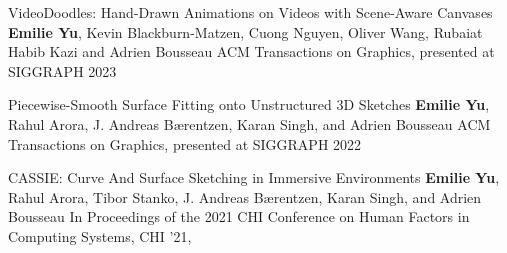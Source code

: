 

\begin{cvpubs}
  \cvpub
    {VideoDoodles: Hand-Drawn Animations on Videos with Scene-Aware Canvases} %
    {\textbf{Emilie Yu}, Kevin Blackburn-Matzen, Cuong Nguyen, Oliver Wang, Rubaiat Habib Kazi and Adrien Bousseau} %
    {ACM Transactions on Graphics, presented at SIGGRAPH 2023} %

  \cvpub
    {Piecewise-Smooth Surface Fitting onto Unstructured 3D Sketches} %
    {\textbf{Emilie Yu}, Rahul Arora, J. Andreas Bærentzen, Karan Singh, and Adrien
    Bousseau} %
    {ACM Transactions on Graphics, presented at SIGGRAPH 2022} %

  \cvpub
    {CASSIE: Curve And Surface Sketching in Immersive Environments} %
    {\textbf{Emilie Yu}, Rahul Arora, Tibor Stanko, J. Andreas Bærentzen, Karan Singh, and Adrien
Bousseau} %
    {In Proceedings of the 2021 CHI Conference on Human
Factors in Computing Systems, CHI ’21, } %

\end{cvpubs}
